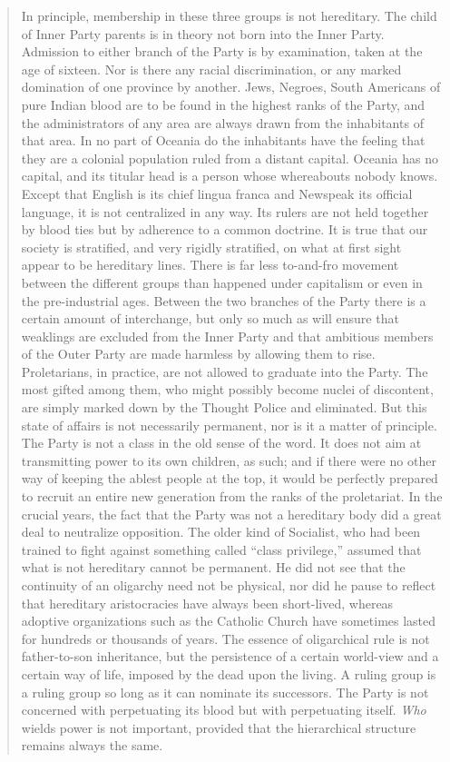 \begin{paracol}{2}
\begin{quotation}
In principle, membership in these three groups is not hereditary. The
child of Inner Party parents is in theory not born into the Inner Party.
Admission to either branch of the Party is by examination, taken at the
age of sixteen. Nor is there any racial discrimination, or any marked
domination of one province by another. Jews, Negroes, South Americans of
pure Indian blood are to be found in the highest ranks of the Party, and
the administrators of any area are always drawn from the inhabitants of
that area. In no part of Oceania do the inhabitants have the feeling
that they are a colonial population ruled from a distant capital.
Oceania has no capital, and its titular head is a person whose
whereabouts nobody knows. Except that English is its chief lingua franca
and Newspeak its official language, it is not centralized in any way.
Its rulers are not held together by blood ties but by adherence to a
common doctrine. It is true that our society is stratified, and very
rigidly stratified, on what at first sight appear to be hereditary
lines. There is far less to-and-fro movement between the different
groups than happened under capitalism or even in the pre-industrial
ages. Between the two branches of the Party there is a certain amount of
interchange, but only so much as will ensure that weaklings are excluded
from the Inner Party and that ambitious members of the Outer Party are
made harmless by allowing them to rise. Proletarians, in practice, are
not allowed to graduate into the Party. The most gifted among them, who
might possibly become nuclei of discontent, are simply marked down by
the Thought Police and eliminated. But this state of affairs is not
necessarily permanent, nor is it a matter of principle. The Party is not
a class in the old sense of the word. It does not aim at transmitting
power to its own children, as such; and if there were no other way of
keeping the ablest people at the top, it would be perfectly prepared to
recruit an entire new generation from the ranks of the proletariat. In
the crucial years, the fact that the Party was not a hereditary body did
a great deal to neutralize opposition. The older kind of Socialist, who
had been trained to fight against something called ``class privilege,''
assumed that what is not hereditary cannot be permanent. He did not see
that the continuity of an oligarchy need not be physical, nor did he
pause to reflect that hereditary aristocracies have always been
short-lived, whereas adoptive organizations such as the Catholic Church
have sometimes lasted for hundreds or thousands of years. The essence of
oligarchical rule is not father-to-son inheritance, but the persistence
of a certain world-view and a certain way of life, imposed by the dead
upon the living. A ruling group is a ruling group so long as it can
nominate its successors. The Party is not concerned with perpetuating
its blood but with perpetuating itself. \emph{Who} wields power is not
important, provided that the hierarchical structure remains always the
same.


\end{quotation}
\end{paracol}
